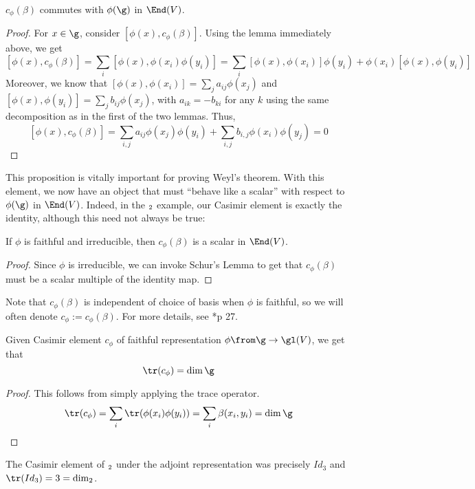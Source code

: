 \documentclass[11pt,leqno,oneside]{amsart}
\numberwithin{thm}{section}
\begin{document}
\begin{prop}
  \(c_\phi(\beta)\) commutes with \(\phi(\g)\) in \(\End(V)\).
\end{prop}
\begin{proof}
  For \(x \in \g\), consider \([\phi(x),c_\phi(\beta)]\). Using the
  lemma immediately above, we get \[
    [\phi(x), c_\phi(\beta)] = \sum_i [\phi(x), \phi(x_i)\phi(y_i)] =
    \sum_i [\phi(x),\phi(x_i)]\phi(y_i) + \phi(x_i)[\phi(x),\phi(y_i)]
  \]
  Moreover, we know that \([\phi(x),\phi(x_i)] = \sum_j a_{ij}
  \phi(x_j)\) and \([\phi(x),\phi(y_i)] = \sum_j b_{ij} \phi(x_j)\),
  with \(a_{ik} = -b_{ki}\) for any \(k\)
  using the same decomposition as in the first of the two
  lemmas. Thus, \[
    [\phi(x), c_\phi(\beta)] = \sum_{i,j} a_{ij} \phi(x_j) \phi(y_i) +
    \sum_{i,j} b_{i,j} \phi(x_i) \phi(y_j) = 0
  \]
\end{proof}
This proposition is vitally important for proving Weyl's theorem. With
this element, we now have an object that must ``behave like a scalar''
with respect to \(\phi(\g)\) in \(\End(V)\). Indeed, in the \(\sl_2\)
example, our Casimir element is exactly the identity, although this
need not always be true:
\begin{prop}
  If \(\phi\) is faithful and irreducible, then \(c_\phi(\beta)\) is a
  scalar in \(\End(V)\).
\end{prop}
\begin{proof}
  Since \(\phi\) is irreducible, we can invoke Schur's Lemma to get
  that \(c_\phi(\beta)\) must be a scalar multiple of the identity map.
\end{proof}
\begin{rmk}
  Note that \(c_\phi(\beta)\) is independent of choice of basis when
  \(\phi\) is faithful, so we will often denote \(c_\phi :=
  c_\phi(\beta)\). For more details, see \cite{humph}*{p 27}.
\end{rmk}
\begin{prop}
  Given Casimir element \(c_\phi\) of faithful representation \(\phi
  \from \g \to \gl(V)\), we get that \[
    \tr(c_\phi) = \dim \g
  \]
\end{prop}
\begin{proof}
  This follows from simply applying the trace operator. \[
    \tr(c_\phi) = \sum_i \tr(\phi(x_i) \phi(y_i)) = \sum_i
    \beta(x_i,y_i) = \dim \g
  \]
\end{proof}
\begin{example}
  The Casimir element of \(\sl_2\) under the adjoint representation
  was precisely \(Id_3\) and \(\tr(Id_3) = 3 = \dim \sl_2\).
\end{example}
\end{document}
